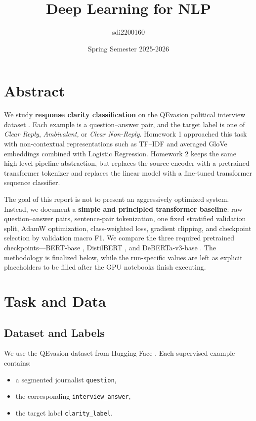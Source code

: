 \documentclass[12pt]{fphw}
\title{Deep Learning for NLP}
\author{sdi2200160}
\date{Spring Semester 2025-2026}
\institute{National and Kapodistrian University of Athens \\ Department of Informatics and Telecommunications}
\begin{document}
\maketitle

{
  \hypersetup{linkcolor=black}
  \tableofcontents
}
\newpage

\section{Abstract}

We study \textbf{response clarity classification} on the QEvasion political interview dataset \cite{qevasion}. Each example is a question--answer pair, and the target label is one of \emph{Clear Reply}, \emph{Ambivalent}, or \emph{Clear Non-Reply}. Homework 1 approached this task with non-contextual representations such as TF--IDF and averaged GloVe embeddings combined with Logistic Regression. Homework 2 keeps the same high-level pipeline abstraction, but replaces the source encoder with a pretrained transformer tokenizer and replaces the linear model with a fine-tuned transformer sequence classifier.

The goal of this report is not to present an aggressively optimized system. Instead, we document a \textbf{simple and principled transformer baseline}: raw question--answer pairs, sentence-pair tokenization, one fixed stratified validation split, AdamW optimization, class-weighted loss, gradient clipping, and checkpoint selection by validation macro F1. We compare the three required pretrained checkpoints---BERT-base \cite{bert}, DistilBERT \cite{distilbert}, and DeBERTa-v3-base \cite{deberta}. The methodology is finalized below, while the run-specific values are left as explicit placeholders to be filled after the GPU notebooks finish executing.

\section{Task and Data}

\subsection{Dataset and Labels}

We use the QEvasion dataset from Hugging Face \cite{qevasion}. Each supervised example contains:
\begin{itemize}
	\item a segmented journalist \texttt{question},
	\item the corresponding \texttt{interview\_answer},
	\item the target label \texttt{clarity\_label}.
\end{itemize}
\end{document}

